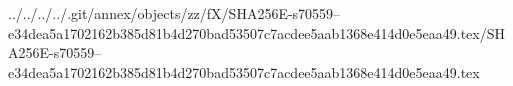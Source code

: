 ../../../../.git/annex/objects/zz/fX/SHA256E-s70559--e34dea5a1702162b385d81b4d270bad53507c7acdee5aab1368e414d0e5eaa49.tex/SHA256E-s70559--e34dea5a1702162b385d81b4d270bad53507c7acdee5aab1368e414d0e5eaa49.tex